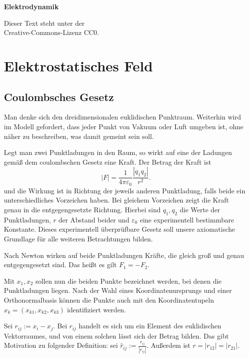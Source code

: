 \documentclass[a4paper,10pt,fleqn,twocolumn,twoside]{article}
\begin{document}
\thispagestyle{empty}

\begin{huge}
\noindent
\textbf{\sffamily Elektrodynamik}
\par
\end{huge}
\vspace{1em}

\noindent
Dieser Text steht unter der\\
Creative-Commons-Lizenz CC0.

\tableofcontents

\section{Elektrostatisches Feld}
\subsection{Coulombsches Gesetz}

Man denke sich den dreidimensionalen euklidischen Punktraum.
Weiterhin wird im Modell gefordert, dass jeder Punkt von Vakuum oder
Luft umgeben ist, ohne näher zu beschreiben, was damit gemeint sein
soll.

Legt man zwei Punktladungen in den Raum, so wirkt auf eine der
Ladungen gemäß dem coulombschen Gesetz eine Kraft.
Der Betrag der Kraft ist
\begin{equation}\label{Coulomb}
|F|=\frac{1}{4\pi\varepsilon_0}\frac{|q_1q_2|}{r^2}.
\end{equation}
und die Wirkung ist in Richtung der jeweils anderen Punktladung,
falls beide ein unterschiedliches Vorzeichen haben. Bei gleichem
Vorzeichen zeigt die Kraft genau in die entgegengesetzte Richtung.
Hierbei sind $q_1,q_2$ die Werte der Punktladungen, $r$ der
Abstand beider und $\varepsilon_0$ eine experimentell bestimmbare
Konstante. Dieses experimentell überprüfbare Gesetz soll unsere
axiomatische Grundlage für alle weiteren Betrachtungen bilden.

Nach Newton wirken auf beide Punktladungen Kräfte, die gleich groß
und genau entgegengesetzt sind. Das heißt es gilt $F_1=-F_2$.

Mit $x_1,x_2$ sollen nun die beiden Punkte bezeichnet werden,
bei denen die Punktladungen liegen. Nach der Wahl eines
Koordinatenursprungs und einer Orthonormalbasis können die
Punkte auch mit den Koordinatentupeln $x_k=(x_{k1},x_{k2},x_{k3})$
identifiziert werden.

Sei $r_{ij}:=x_i-x_j$. Bei $r_{ij}$ handelt es sich um ein
Element des euklidischen Vektorraumes, und von einem solchen lässt
sich der Betrag bilden. Das gibt Motivation zu folgender
Definition: sei $\hat r_{ij}:=\frac{r_{ij}}{|r_{ij}|}$.
Außerdem ist $r=|r_{12}|=|r_{21}|$.
\end{document}

